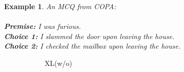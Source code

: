 \documentclass[letterpaper]{article} %
\newtheorem{example}{Example}
\newcommand{\crosssymbol}{{\color{red} \XSolidBrush} }
\newcommand{\checksymbol}{{\color{green} \Checkmark} }
\begin{document}
\begin{example}\label{ex:copa2}
An MCQ from COPA:\\ \\
\noindent
\textbf{Premise:} I was furious.\\
\textbf{Choice 1:} I slammed the door upon leaving the house.  \checksymbol \\
\textbf{Choice 2:} I checked the mailbox upon leaving the house. \crosssymbol
\end{example}

\begin{figure}[th!]
\centering
\begin{subfigure}[b]{0.20\textwidth}
\centering
{}
\caption{XL(w/o)}
\label{fig:copa2_o}
\end{subfigure}
\hfill
\newpage
\begin{subfigure}[b]{0.20\textwidth}
\centering

\end{subfigure}
\end{figure}
\end{document}
